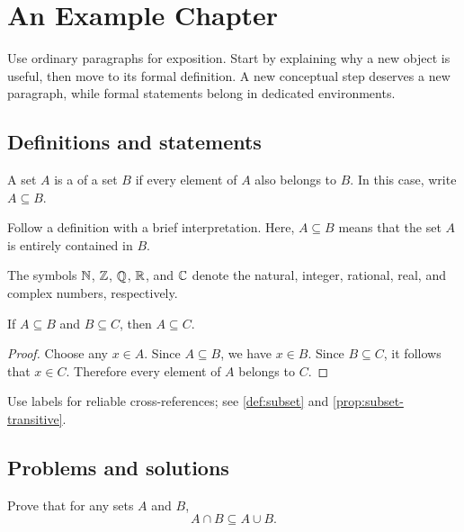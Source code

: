 \chapter{An Example Chapter}
\label{ch:example}

Use ordinary paragraphs for exposition. Start by explaining why a new object
is useful, then move to its formal definition. A new conceptual step deserves
a new paragraph, while formal statements belong in dedicated environments.

\section{Definitions and statements}

\begin{definition}[Subset]
  \label{def:subset}
  A set $A$ is a  of a set $B$ if every element of $A$ also
  belongs to $B$. In this case, write $A \subseteq B$.
\end{definition}

Follow a definition with a brief interpretation. Here, $A \subseteq B$ means
that the set $A$ is entirely contained in $B$.

\begin{notation}
  The symbols $\mathbb{N}$, $\mathbb{Z}$, $\mathbb{Q}$, $\mathbb{R}$, and $\mathbb{C}$ denote the natural, integer,
  rational, real, and complex numbers, respectively.
\end{notation}

\begin{proposition}
  \label{prop:subset-transitive}
  If $A \subseteq B$ and $B \subseteq C$, then $A \subseteq C$.
\end{proposition}

\begin{proof}
  Choose any $x \in A$. Since $A \subseteq B$, we have $x \in B$. Since
  $B \subseteq C$, it follows that $x \in C$. Therefore every element of
  $A$ belongs to $C$.
\end{proof}

Use labels for reliable cross-references; see \cref{def:subset} and
\cref{prop:subset-transitive}.

\section{Problems and solutions}

\begin{problem}
  \label{prob:intersection-union}
  Prove that for any sets $A$ and $B$,
  \[
    A \cap B \subseteq A \cup B.
  \]
\end{problem}

